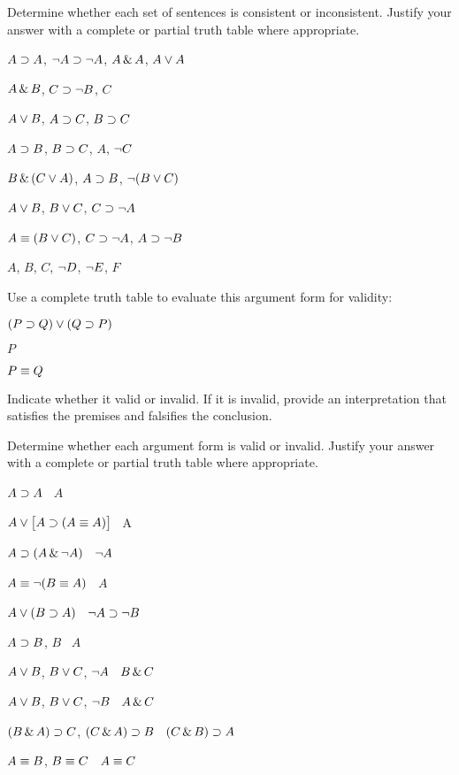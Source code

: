 \solutions
\problempart
\label{pr.TT.consistent}
Determine whether each set of sentences is consistent or inconsistent. Justify your answer with a complete or partial truth table where appropriate.
\begin{earg}
\item $A\supset A$, $\neg A \supset \neg A$, $A\,\&\, A$, $A\vee A$ %
\item $A \,\&\, B$, $C\supset \neg B$, $C$ %
\item $A\vee B$, $A\supset C$, $B\supset C$ %
\item $A\supset B$, $B\supset C$, $A$, $\neg C$ %
\item $B\,\&\,(C\vee A)$, $A\supset B$, $\neg(B\vee C)$  %
\item $A \vee B$, $B\vee C$, $C\supset \neg A$ %
\item $A\equiv(B\vee C)$, $C\supset \neg A$, $A\supset \neg B$ %
\item $A$, $B$, $C$, $\neg D$, $\neg E$, $F$ %
\end{earg}


\problempart
\label{HW3.B}

Use a complete truth table to evaluate this argument form for validity:

\begin{earg}
\item[] $(P \supset Q) \vee (Q \supset P)$
\item[] $P$
\item[\therefore] $P\equiv Q$
\end{earg}

Indicate whether it valid or invalid. If it is invalid, provide an interpretation that satisfies the premises and falsifies the conclusion. 




\solutions
\problempart
\label{pr.TT.valid}
Determine whether each argument form is valid or invalid. Justify your answer with a complete or partial truth table where appropriate.
\begin{earg}
\item $A\supset A$ \therefore\ $A$ %
\item $A\vee\bigl[A\supset(A\equiv A)\bigr]$ \therefore\ A %
\item $A\supset(A\,\&\,\neg A)$ \therefore\ $\neg A$ %
\item $A\equiv\neg(B\equiv A)$ \therefore\ $A$ %
\item $A\vee(B\supset A)$ \therefore\ $\neg A \supset \neg B$ %
\item $A\supset B$, $B$ \therefore\ $A$ %
\item $A\vee B$, $B\vee C$, $\neg A$ \therefore\ $B \,\&\, C$ %
\item $A\vee B$, $B\vee C$, $\neg B$ \therefore\ $A \,\&\, C$ %
\item $(B\,\&\, A)\supset C$, $(C\,\&\, A)\supset B$ \therefore\ $(C\,\&\, B)\supset A$ %
\item $A\equiv B$, $B\equiv C$ \therefore\ $A\equiv C$ %
\end{earg}

